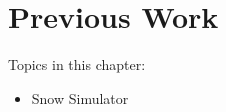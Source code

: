 \chapter{Previous Work}

Topics in this chapter:
\begin{itemize}
	\item Snow Simulator
\end{itemize}

